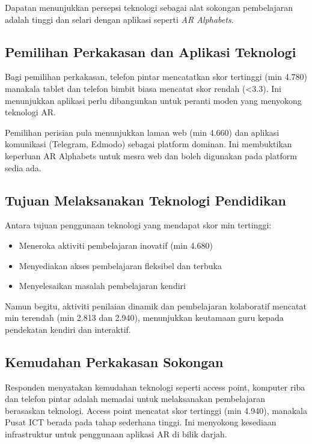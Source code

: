 {{Dapatan menunjukkan persepsi teknologi sebagai alat sokongan pembelajaran adalah tinggi dan selari dengan aplikasi seperti \textit{AR Alphabets}.

\subsection{Pemilihan Perkakasan dan Aplikasi Teknologi}

Bagi pemilihan perkakasan, telefon pintar mencatatkan skor tertinggi (min 4.780) manakala tablet dan telefon bimbit biasa mencatat skor rendah (<3.3). Ini menunjukkan aplikasi perlu dibangunkan untuk peranti moden yang menyokong teknologi AR.

Pemilihan perisian pula menunjukkan laman web (min 4.660) dan aplikasi komunikasi (Telegram, Edmodo) sebagai platform dominan. Ini membuktikan keperluan AR Alphabets untuk mesra web dan boleh digunakan pada platform sedia ada.

\subsection{Tujuan Melaksanakan Teknologi Pendidikan}

Antara tujuan penggunaan teknologi yang mendapat skor min tertinggi:

\begin{itemize}
    \item Meneroka aktiviti pembelajaran inovatif (min 4.680)
    \item Menyediakan akses pembelajaran fleksibel dan terbuka
    \item Menyelesaikan masalah pembelajaran kendiri
\end{itemize}

Namun begitu, aktiviti penilaian dinamik dan pembelajaran kolaboratif mencatat min terendah (min 2.813 dan 2.940), menunjukkan keutamaan guru kepada pendekatan kendiri dan interaktif.

\subsection{Kemudahan Perkakasan Sokongan}

Responden menyatakan kemudahan teknologi seperti access point, komputer riba dan telefon pintar adalah memadai untuk melaksanakan pembelajaran berasaskan teknologi. Access point mencatat skor tertinggi (min 4.940), manakala Pusat ICT berada pada tahap sederhana tinggi. Ini menyokong kesediaan infrastruktur untuk penggunaan aplikasi AR di bilik darjah.

}}
